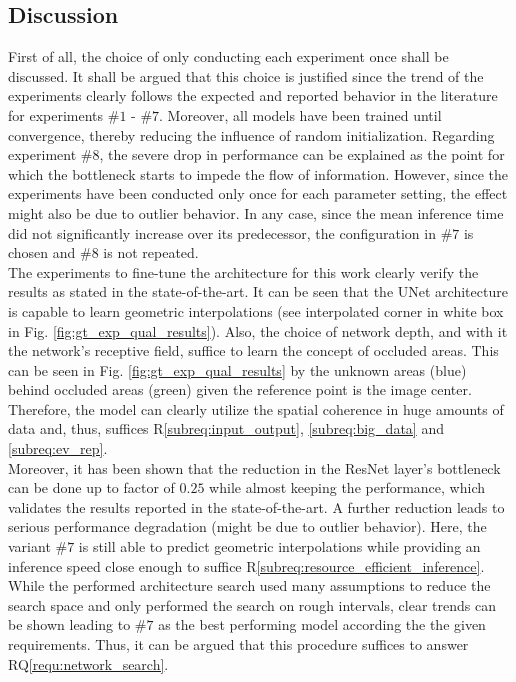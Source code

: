 \subsection{Discussion}
\label{subsec:discussion_unet_arch}
First of all, the choice of only conducting each experiment once shall be discussed. It shall be argued that this choice is justified since the trend of the experiments clearly follows the expected and reported behavior in the literature for experiments $\#1$ - $\#7$. Moreover, all models have been trained until convergence, thereby reducing the influence of random initialization. Regarding experiment $\#8$, the severe drop in performance can be explained as the point for which the bottleneck starts to impede the flow of information. However, since the experiments have been conducted only once for each parameter setting, the effect might also be due to outlier behavior. In any case, since the mean inference time did not significantly increase over its predecessor, the configuration in $\#7$ is chosen and $\#8$ is not repeated.  
\\
The experiments to fine-tune the architecture for this work clearly verify the results as stated in the state-of-the-art. It can be seen that the UNet architecture is capable to learn geometric interpolations (see interpolated corner in white box in Fig. \ref{fig:gt_exp_qual_results}). Also, the choice of network depth, and with it the network's receptive field, suffice to learn the concept of occluded areas. This can be seen in Fig. \ref{fig:gt_exp_qual_results} by the unknown areas (blue) behind occluded areas (green) given the reference point is the image center. Therefore, the model can clearly utilize the spatial coherence in huge amounts of data and, thus, suffices R\ref{subreq:input_output}, \ref{subreq:big_data} and \ref{subreq:ev_rep}.
\\
Moreover, it has been shown that the reduction in the ResNet layer's bottleneck can be done up to factor of $0.25$ while almost keeping the performance, which validates the results reported in the state-of-the-art. A further reduction leads to serious performance degradation (might be due to outlier behavior). Here, the variant $\#7$ is still able to predict geometric interpolations while providing an inference speed close enough to suffice R\ref{subreq:resource_efficient_inference}.
\\
While the performed architecture search used many assumptions to reduce the search space and only performed the search on rough intervals, clear trends can be shown leading to $\#7$ as the best performing model according the the given requirements. Thus, it can be argued that this procedure suffices to answer RQ\ref{requ:network_search}.
%
